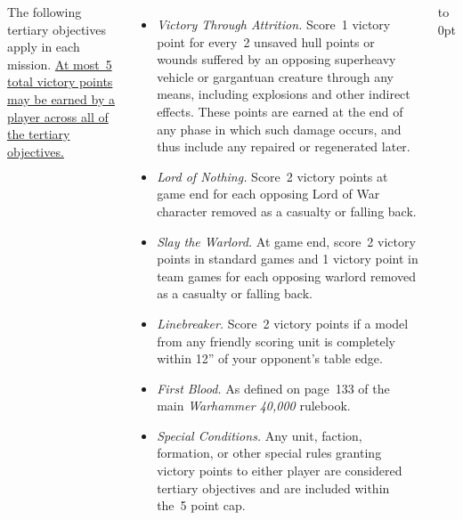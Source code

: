 \begin{columns}

The following tertiary objectives apply in each mission.
\underline{At most~5 total victory points may be earned by a}
\underline{player across all of the tertiary objectives.}

\vspace*{-1pt}%
\begin{itemize}
\item \textit{Victory Through Attrition.}  Score~1 victory point for
  every~2 unsaved hull points or wounds suffered by an opposing
  superheavy vehicle or gargantuan creature through any means,
  including explosions and other indirect effects.  These points are
  earned at the end of any phase in which such damage occurs, and thus
  include any repaired or regenerated later.

\vspace*{-10pt}%
\item \textit{Lord of Nothing.}  Score~2 victory points at game end
  for each opposing Lord of War character removed as a casualty or
  falling back.

\vspace*{-10pt}%
\item \textit{Slay the Warlord.}  At game end, score~2 victory points
  in standard games and 1 victory point in team games for each
  opposing warlord removed as a casualty or falling back.

\vspace*{-10pt}%
\item \textit{Linebreaker.}  Score~2 victory points if a model from
  any friendly scoring unit is completely within 12'' of your
  opponent's table edge.

\vspace*{-10pt}%
\item \textit{First Blood.}  As defined on page~133 of the main
  \emph{Warhammer 40,000} rulebook.

\vspace*{-10pt}%
\item \textit{Special Conditions.}  Any unit, faction, formation, or
  other special rules granting victory points to either player are
  considered tertiary objectives and are included within the~5 point
  cap.
\end{itemize}

\vfill\vbox to 0pt{}
\end{columns}
